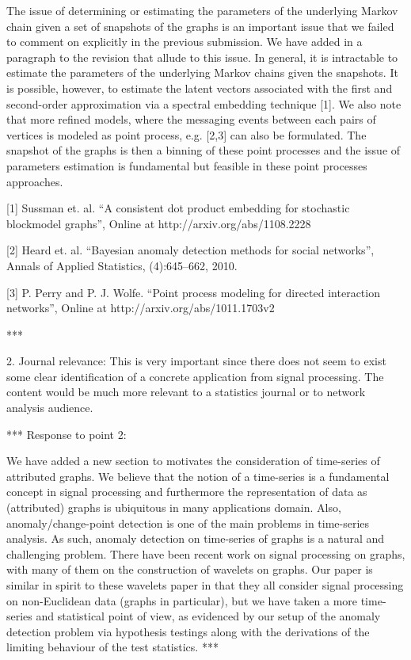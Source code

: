     The issue of determining or estimating the parameters of the
    underlying Markov chain given a set of snapshots of the graphs is an
    important issue that we failed to comment on explicitly in the
    previous submission. We have added in a paragraph to the revision that
    allude to this issue. In general, it is intractable to estimate the
    parameters of the underlying Markov chains given the snapshots. It is
    possible, however, to estimate the latent vectors associated with the
    first and second-order approximation via a spectral embedding
    technique [1]. We also note that more refined models, where the
    messaging events between each pairs of vertices is modeled as point
    process, e.g. [2,3] can also be formulated. The snapshot of the graphs
    is then a binning of these point processes and the issue of parameters
    estimation is fundamental but feasible in these point processes
    approaches.

    [1] Sussman et. al. ``A consistent dot product embedding for
    stochastic blockmodel graphs'', Online at http://arxiv.org/abs/1108.2228

    [2] Heard et. al. ``Bayesian anomaly detection methods for social
    networks'', Annals of Applied Statistics, (4):645--662, 2010.

    [3] P. Perry and P. J. Wolfe. ``Point process modeling for directed
    interaction networks'', Online at http://arxiv.org/abs/1011.1703v2

***

2. Journal relevance: This is very important since there does not seem
to exist some clear identification of a concrete application from
signal processing. The content would be much more relevant to a
statistics journal or to network analysis audience.

*** Response to point 2:
    
We have added a new section to motivates the consideration of
time-series of attributed graphs. We believe that the notion of a
time-series is a fundamental concept in signal processing and
furthermore the representation of data as (attributed) graphs is
ubiquitous in many applications domain. Also, anomaly/change-point
detection is one of the main problems in time-series analysis. As
such, anomaly detection on time-series of graphs is a natural and
challenging problem. There have been recent work on signal processing
on graphs, with many of them on the construction of wavelets on
graphs. Our paper is similar in spirit to these wavelets paper in that
they all consider signal processing on non-Euclidean data (graphs in
particular), but we have taken a more time-series and statistical 
point of view, as evidenced by our setup of the anomaly detection
problem via hypothesis testings along with the derivations of the
limiting behaviour of the test statistics.  
***

